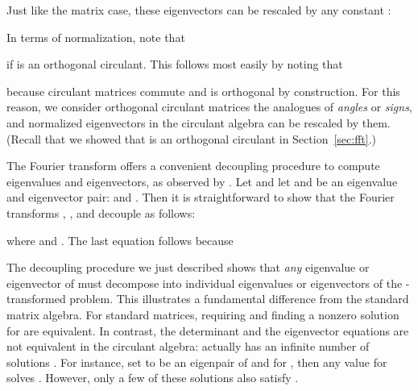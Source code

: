 \documentclass[1p,authoryear,letterpaper]{elsarticle}
\begin{document}
Just like the matrix case, these eigenvectors can
be rescaled by any constant :

In terms of normalization, note that

if  is an orthogonal circulant.  This follows
most easily by noting that

because circulant matrices commute and  is orthogonal by construction.
For this reason, we consider orthogonal circulant matrices the
analogues of \emph{angles} or \emph{signs}, and normalized eigenvectors in the circulant algebra
can be rescaled by them. (Recall that we showed
that  is an orthogonal circulant in
Section~\ref{sec:fft}.)




The Fourier transform offers a
convenient decoupling procedure to compute eigenvalues and eigenvectors,
as observed by \citet{braman201x-tensor-eigenvalues}.
 Let  and let
 and  be an eigenvalue
and eigenvector pair: 
and .
Then it is straightforward to show that the Fourier transforms , ,
and  decouple as follows:

where  and .
The last equation follows because


The decoupling procedure we just described shows that \emph{any}
eigenvalue or eigenvector of  must
decompose into individual eigenvalues or eigenvectors of the
-transformed problem.
This illustrates a fundamental difference from the
standard matrix algebra. For standard matrices, requiring
 and finding a nonzero solution
 for  are equivalent. In contrast,
the determinant and the eigenvector
equations are not  equivalent in the circulant algebra:
 actually has an
infinite number of solutions .  For instance,
set 
to be an eigenpair of  and  for , then any
value for  solves .
However, only a few of these solutions also satisfy
.
\end{document}

